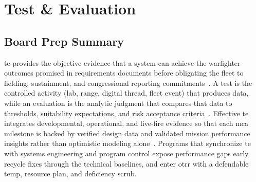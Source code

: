 \documentclass[../main.tex]{subfiles}
\begin{document}
\section{Test \& Evaluation}

\subsection{Board Prep Summary}
\ac{te} provides the objective evidence that a system can achieve the warfighter outcomes promised in requirements documents before obligating the fleet to fielding, sustainment, and congressional reporting commitments~\autocite{edo-3-5-5-test-eval-part-i-2025,DoDI5000-85}. A test is the controlled activity (lab, range, digital thread, fleet event) that produces data, while an evaluation is the analytic judgment that compares that data to thresholds, suitability expectations, and risk acceptance criteria~\autocite{edo-3-5-5-test-eval-part-i-2025}. Effective \ac{te} integrates developmental, operational, and live-fire evidence so that each \ac{mca} milestone is backed by verified design data and validated mission performance insights rather than optimistic modeling alone~\autocite{DoDI5000-89}. Programs that synchronize \ac{te} with systems engineering and program control expose performance gaps early, recycle fixes through the technical baselines, and enter \ac{otrr} with a defendable \ac{temp}, resource plan, and deficiency scrub.
\end{document}
